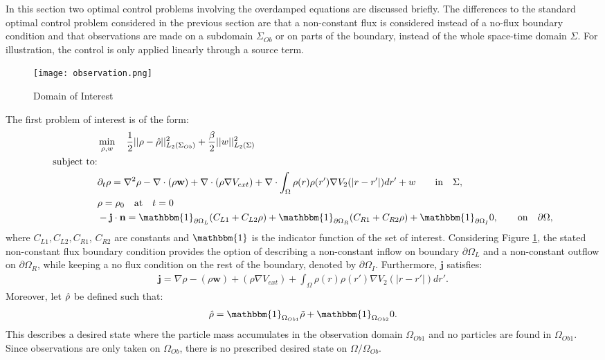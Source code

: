 In this section two optimal control problems involving the overdamped equations are discussed briefly. The differences to the standard optimal control problem considered in the previous section are that a non-constant flux is considered instead of a no-flux boundary condition and that observations are made on a subdomain $\Sigma_{Ob}$ or on parts of the boundary, instead of the whole space-time domain $\Sigma$. For illustration, the control is only applied linearly through a source term. 
\begin{figure}[h]
	\texttt{[image: observation.png]}
	\caption{Domain of Interest}
	\label{Observation1}
\end{figure}
The first problem of interest is of the form:
\begin{align*}
&\min_{\Sta, w} \quad \frac{1}{2}|| \Sta -\hat \Sta||^2_{L_2( \Sigma_{Ob})} + \frac{\beta}{2}||w||^2_{L_2(\Sigma)}\\
\text{subject to:}\\
&\partial_t \rho = \nabla^2 \rho - \nabla \cdot (\rho \mathbf{w}) +\nabla \cdot (\rho \nabla V_{ext}) + \nabla \cdot \int_\Omega \rho(r) \rho(r') \nabla V_2(|r-r'|) dr' + w \quad  \quad\text{in} \quad \Sigma,\notag\\
& \rho = \rho_0 \quad \text{at} \quad t=0 \notag\\
& - \mathbf{j} \cdot \nor = \mathbbm{1}_{\partial \Omega_L}( C_{L1}  + C_{L2}\Sta) +\mathbbm{1}_{\partial \Omega_R} ( C_{R1}  + C_{R2}\Sta) +\mathbbm{1}_{\partial \Omega_I} 0, \quad  \quad\text{on} \quad \partial \Omega, 
\end{align*}
where $C_{L1}, C_{L2}, C_{R1}$, $C_{R2}$ are constants and $\mathbbm{1}$ is the indicator function of the set of interest. Considering Figure \ref{Observation1}, the stated non-constant flux boundary condition provides the option of describing a non-constant inflow on boundary $\partial \Omega_L$ and a non-constant outflow on $\partial \Omega_R$, while keeping a no flux condition on the rest of the boundary, denoted by $\partial \Omega_I$.
Furthermore, $\mathbf{j}$ satisfies:
\begin{align*}
\mathbf{j}=\nabla \rho - (\rho \mathbf{w}) +(\rho \nabla V_{ext}) +  \int_\Omega \rho(r) \rho(r') \nabla V_2(|r-r'|) dr'.
\end{align*}
Moreover, let $\hat {\rho}$ be defined such that:
\begin{align*}
\hat \Sta = \mathbbm{1}_{ \Omega_{Ob1}} \tilde \Sta  +\mathbbm{1}_{ \Omega_{Ob2}} 0.
\end{align*}
This describes a desired state where the particle mass accumulates in the observation domain $\Omega_{Ob1}$ and no particles are found in $\Omega_{Ob1}$. Since observations are only taken on $\Omega_{Ob}$, there is no prescribed desired state on $\Omega / \Omega_{Ob}$.\\
